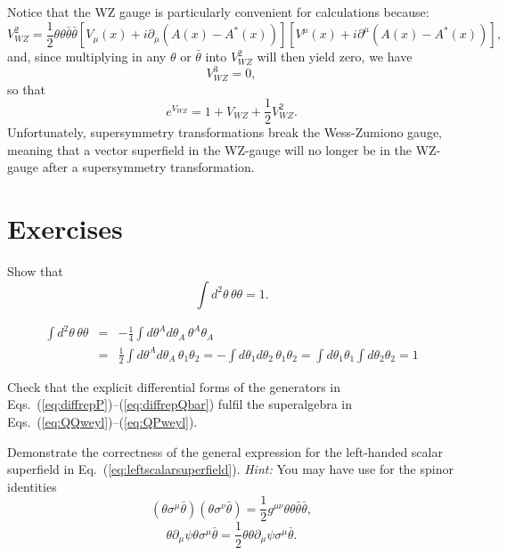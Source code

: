 \documentclass[notes.tex]{subfiles}
\begin{document}
Notice that the WZ gauge is particularly convenient for calculations because:
\begin{equation}
V_{WZ}^2 = \frac{1}{2}\theta\theta\bar{\theta}\bar{\theta}[V_\mu(x) + i\partial_\mu(A(x) - A^*(x))][V^\mu(x) + i\partial^\mu(A(x) - A^*(x))],
\label{eq:V2_WZ}
\end{equation}
and, since multiplying in any $\theta$ or $\bar\theta$ into $V_{WZ}^2$ will then yield zero, we have 
\[V_{WZ}^3 = 0,\]
so that 
\[e^{V_{WZ}} = 1 + V_{WZ} + \frac{1}{2}V_{WZ}^2.\]
Unfortunately, supersymmetry transformations break the Wess-Zumiono gauge, meaning that a vector superfield in the WZ-gauge will no longer be in the WZ-gauge after a supersymmetry transformation. 



\section{Exercises}
\noindent

\begin{Exercise}
Show that
\[\int d^2\theta\,\theta\theta = 1.\]
\end{Exercise}

\begin{Answer}
\begin{eqnarray*}
\int d^2\theta\,\theta\theta &=& - \frac{1}{4} \int d\theta^Ad\theta_A\,\theta^A\theta_A \\
&=& \frac{1}{2} \int d\theta^Ad\theta_A\,\theta_1\theta_2
= - \int d\theta_1d\theta_2\,\theta_1\theta_2=\int d\theta_1\theta_1\int d\theta_2\theta_2=1
\end{eqnarray*}
\end{Answer}

\begin{Exercise}
Check that the explicit differential forms of the generators in Eqs.~(\ref{eq:diffrepP})--(\ref{eq:diffrepQbar}) fulfil the superalgebra in Eqs.~(\ref{eq:QQweyl})--(\ref{eq:QPweyl}).
\end{Exercise}

\begin{Exercise}
Demonstrate the correctness of the general expression for the left-handed scalar superfield in Eq.~(\ref{eq:leftscalarsuperfield}). {\it Hint:} You may have use for the spinor identities
\[ (\theta\sigma^\mu \bar{\theta})(\theta\sigma^\nu \bar{\theta})=\frac{1}{2}g^{\mu\nu}\theta\theta\bar\theta\bar\theta, \]
\[ \theta\partial_\mu\psi\theta\sigma^\mu \bar{\theta}=\frac{1}{2}\theta\theta\partial_\mu \psi\sigma^\mu\bar{\theta}. \]
\end{Exercise}
\end{document}

